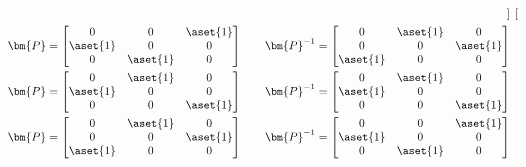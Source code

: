\begin{itemize}
\begin{enumerate}
{\begin{align*}
\begin{bmatrix}
          \end{bmatrix} \\
          \bm{P} =
          \begin{bmatrix}
            0 & 0 & \aset{1} \\
            \aset{1} & 0 & 0 \\
            0 & \aset{1} & 0
          \end{bmatrix} \qquad
          \bm{P}^{-1} =
          \begin{bmatrix}
            0 & \aset{1} & 0 \\
            0 & 0 & \aset{1} \\
            \aset{1} & 0 & 0
          \end{bmatrix} \\
          \bm{P} =
          \begin{bmatrix}
            0 & \aset{1} & 0  \\
            \aset{1} & 0 & 0 \\
            0 & 0 & \aset{1}
          \end{bmatrix} \qquad
          \bm{P}^{-1} =
          \begin{bmatrix}
            0 & \aset{1} & 0  \\
            \aset{1} & 0 & 0 \\
            0 & 0 & \aset{1}
          \end{bmatrix} \\
          \bm{P} =
          \begin{bmatrix}
            0 & \aset{1} & 0 \\
            0 & 0 & \aset{1} \\
            \aset{1} & 0 & 0
          \end{bmatrix} \qquad
          \bm{P}^{-1} =
          \begin{bmatrix}
            0 & 0 & \aset{1} \\
            \aset{1} & 0 & 0 \\
            0 & \aset{1} & 0
          \end{bmatrix}
        \end{align*}}


\end{enumerate}
\end{itemize}
